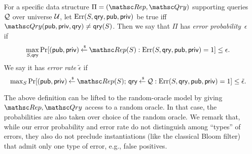 \begin{definition} \rm
For a specific data structure $\setprim=(\Rep, \Qry)$ supporting
queries ${\cal Q}$ over universe ${\cal U}$, let
$\mathrm{Err}(S,\mathsf{qry},{\sf pub},{\sf priv})$ be  true iff
$\Qry(\pubaux,\privaux, \qry) \neq \qry(S)$.  Then we say that $\Pi$
has \emph{error probability}~$\epsilon$ if
\[\max_{S,\qry}\Pr[(\pubaux,\privaux) \getsr \Rep(S) :
\mathrm{Err}(S,\qry,\pubaux,\privaux)=1 ] \leq \epsilon.\]
%
We say it has \emph{error rate} $\tilde{\epsilon}$ if
\[{\textstyle \max_{S}\Pr[(\pubaux,\privaux) \getsr \Rep(S);\, \qry \getsr \calQ :
\mathrm{Err}(S,\qry,\pubaux,\privaux)=1]} \leq \tilde{\epsilon}. \]
\end{definition}


The above definition can be lifted to the random-oracle model by
giving $\Rep, \Qry$ access to a random oracle. In that case, the
probabilities are also taken over choice of the random oracle. We
remark that, while our error probability and error rate do not
distinguish among ``types'' of errors, they also do not preclude
instantiations (like the classical Bloom filter) that admit only one
type of error, e.g., false positives.



